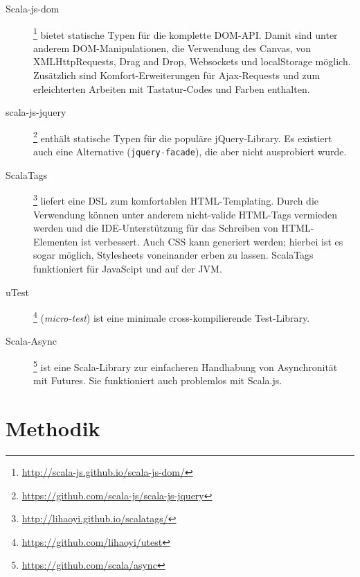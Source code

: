 \documentclass[a4paper, 12pt, hidelinks, listof=totoc, listoftables=totoc, bibliography=totoc]{scrreprt}
\newcommand{\code}[1]{\lstinline[language=Scala, style=inline]|#1|}
\begin{document}
\begin{description}
	\item[Scala-js-dom]\footnote{\url{http://scala-js.github.io/scala-js-dom/}} bietet statische Typen für die komplette \ac{DOM}-\ac{API}. Damit sind unter anderem DOM-Manipulationen, die Verwendung des Canvas, von XMLHttpRequests, Drag and Drop, Websockets und localStorage möglich. Zusätzlich sind Komfort-Erweiterungen für Ajax-Requests und zum erleichterten Arbeiten mit Tastatur-Codes und Farben enthalten.
	
	\item[scala-js-jquery]\footnote{\url{https://github.com/scala-js/scala-js-jquery}} enthält statische Typen für die populäre jQuery-Library. Es existiert auch eine Alternative (\code{jquery-facade}), die aber nicht ausprobiert wurde.
	
	\item[ScalaTags]\footnote{\url{http://lihaoyi.github.io/scalatags/}} liefert eine \ac{DSL} zum komfortablen \ac{HTML}-Templating. Durch die Verwendung können unter anderem nicht-valide \ac{HTML}-Tags vermieden werden und die \ac{IDE}-Unterstützung für das Schreiben von \ac{HTML}-Elementen ist verbessert. Auch \ac{CSS} kann generiert werden; hierbei ist es sogar möglich, Stylesheets voneinander erben zu lassen. ScalaTags funktioniert für JavaScipt und auf der \ac{JVM}.

	\item[uTest]\footnote{\url{https://github.com/lihaoyi/utest}} (\emph{micro-test}) ist eine minimale cross-kompilierende Test-Library.
	
	\item[Scala-Async]\footnote{\url{https://github.com/scala/async}} ist eine Scala-Library zur einfacheren Handhabung von Asynchronität mit Futures. Sie funktioniert auch problemlos mit Scala.js.
%	
%	
\end{description}



\chapter{Methodik}\label{chap:methods}
\end{document}
